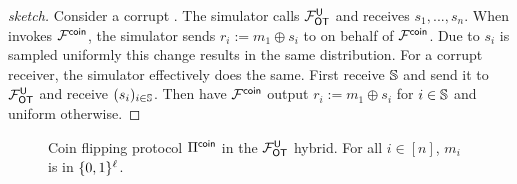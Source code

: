\else
\begin{proof}[sketch]
	Consider a corrupt \send. The simulator calls $\mathcal{F}_{\mathsf{OT}}^{\mathsf{U}}$ and receives $s_1,...,s_n$. When \send invokes $\mathcal{F}^{\mathsf{coin}}$, the simulator sends $r_i:=m_1\oplus s_i$ to \send on behalf of $\mathcal{F}^{\mathsf{coin}}$. Due to $s_i$ is sampled uniformly this change results in the same distribution. 
	For a corrupt receiver, the simulator effectively does the same. First receive $\mathsf{\mathbb S}$ and send it to $\mathcal{F}_{\mathsf{OT}}^{\mathsf{U}}$ and receive $(s_i)_{i\in\mathsf{\mathbb S}}$. Then have  $\mathcal{F}^{\mathsf{coin}}$ output $r_i:=m_1\oplus s_i$ for $i\in\mathsf{\mathbb S}$ and uniform otherwise.
\pe
\end{proof}
\fi























\begin{figure}
\centering
{}
\vspace{-0.5cm}
	\caption{Coin flipping protocol $\Pi^{\mathsf{coin}}$ in the $\mathcal{F}_{\mathsf{OT}}^{\mathsf{U}}$ hybrid. For all $i\in[n]$, $m_i$ is in $\{0,1\}^\ell$.}
	\label{fig:coinFlip}
\end{figure}



